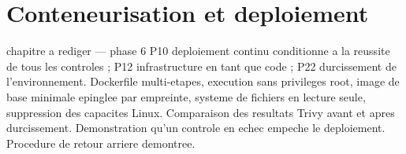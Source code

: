﻿%
\chapter{Conteneurisation et deploiement}
\label{chap:conteneurisation}

\begin{constat}{chapitre a rediger --- phase 6}
P10 deploiement continu conditionne a la reussite de tous les controles ; P12 infrastructure en tant que code ; P22 durcissement de l'environnement. Dockerfile multi-etapes, execution sans privileges root, image de base minimale epinglee par empreinte, systeme de fichiers en lecture seule, suppression des capacites Linux. Comparaison des resultats Trivy avant et apres durcissement. Demonstration qu'un controle en echec empeche le deploiement. Procedure de retour arriere demontree.
\end{constat}

